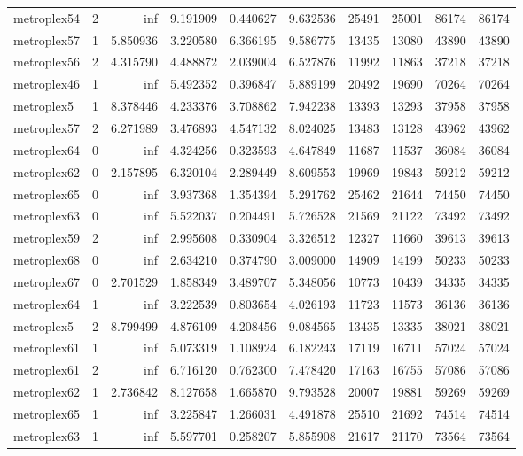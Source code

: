 \begin{longtable}{|l|r|r|r|r|r|r|r|r|r|}
metroplex54 & 2 & inf & 9.191909 & 0.440627 & 9.632536 & 25491 & 25001 & 86174 & 86174 \\
metroplex57 & 1 & 5.850936 & 3.220580 & 6.366195 & 9.586775 & 13435 & 13080 & 43890 & 43890 \\
metroplex56 & 2 & 4.315790 & 4.488872 & 2.039004 & 6.527876 & 11992 & 11863 & 37218 & 37218 \\
metroplex46 & 1 & inf & 5.492352 & 0.396847 & 5.889199 & 20492 & 19690 & 70264 & 70264 \\
metroplex5 & 1 & 8.378446 & 4.233376 & 3.708862 & 7.942238 & 13393 & 13293 & 37958 & 37958 \\
metroplex57 & 2 & 6.271989 & 3.476893 & 4.547132 & 8.024025 & 13483 & 13128 & 43962 & 43962 \\
metroplex64 & 0 & inf & 4.324256 & 0.323593 & 4.647849 & 11687 & 11537 & 36084 & 36084 \\
metroplex62 & 0 & 2.157895 & 6.320104 & 2.289449 & 8.609553 & 19969 & 19843 & 59212 & 59212 \\
metroplex65 & 0 & inf & 3.937368 & 1.354394 & 5.291762 & 25462 & 21644 & 74450 & 74450 \\
metroplex63 & 0 & inf & 5.522037 & 0.204491 & 5.726528 & 21569 & 21122 & 73492 & 73492 \\
metroplex59 & 2 & inf & 2.995608 & 0.330904 & 3.326512 & 12327 & 11660 & 39613 & 39613 \\
metroplex68 & 0 & inf & 2.634210 & 0.374790 & 3.009000 & 14909 & 14199 & 50233 & 50233 \\
metroplex67 & 0 & 2.701529 & 1.858349 & 3.489707 & 5.348056 & 10773 & 10439 & 34335 & 34335 \\
metroplex64 & 1 & inf & 3.222539 & 0.803654 & 4.026193 & 11723 & 11573 & 36136 & 36136 \\
metroplex5 & 2 & 8.799499 & 4.876109 & 4.208456 & 9.084565 & 13435 & 13335 & 38021 & 38021 \\
metroplex61 & 1 & inf & 5.073319 & 1.108924 & 6.182243 & 17119 & 16711 & 57024 & 57024 \\
metroplex61 & 2 & inf & 6.716120 & 0.762300 & 7.478420 & 17163 & 16755 & 57086 & 57086 \\
metroplex62 & 1 & 2.736842 & 8.127658 & 1.665870 & 9.793528 & 20007 & 19881 & 59269 & 59269 \\
metroplex65 & 1 & inf & 3.225847 & 1.266031 & 4.491878 & 25510 & 21692 & 74514 & 74514 \\
metroplex63 & 1 & inf & 5.597701 & 0.258207 & 5.855908 & 21617 & 21170 & 73564 & 73564 \\

\end{longtable}
